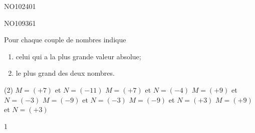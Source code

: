 \documentclass[a4paper,11pt]{report}
\begin{document}
\begin{exof}{NO102}{40}{1}
\end{exof}
\begin{exol}{NO109}{36}{1}
\end{exol}
\begin{exo}
{Pour chaque couple de nombres indique 
\begin{enumerate}[itemsep=5pt]
	\item[1)] celui qui a la plus grande valeur absolue;
	\item[2)] le plus grand des deux nombres.
\end{enumerate}
\begin{tasks}(2)
    \task $M=(+7)$ et $N=(-11)$
    \task $M= (+7)$ et $N=(-4)$
    \task $M= (+9)$ et $N=(-3)$
    \task $M= (-9)$ et $N=(-3)$
    \task $M= (-9)$ et $N=(+3)$
    \task $M= (+9)$ et $N=(+3)$
\end{tasks}}
{1}
\end{exo}
\end{document}
